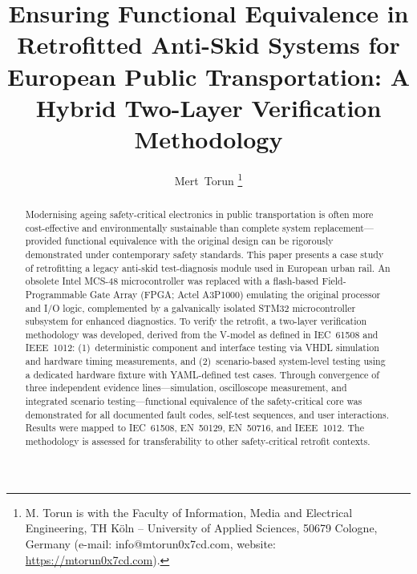 \documentclass[journal, a4paper]{IEEEtran}
\begin{document}
\thispagestyle{empty}

\title{Ensuring Functional Equivalence in Retrofitted Anti-Skid Systems for European Public Transportation: A Hybrid Two-Layer Verification Methodology}

\author{Mert~Torun \thanks{M. Torun is with the Faculty of Information, Media and Electrical Engineering, TH Köln -- University of Applied Sciences, 50679 Cologne, Germany (e-mail: info@mtorun0x7cd.com, website: \url{https://mtorun0x7cd.com}).}}

\markboth{}%
{}

\maketitle

\begin{abstract}
Modernising ageing safety-critical electronics in public transportation is often more cost-effective and environmentally sustainable than complete system replacement---provided functional equivalence with the original design can be rigorously demonstrated under contemporary safety standards. This paper presents a case study of retrofitting a legacy anti-skid test-diagnosis module used in European urban rail. An obsolete Intel MCS-48 microcontroller was replaced with a flash-based Field-Programmable Gate Array (FPGA; Actel A3P1000) emulating the original processor and I/O logic, complemented by a galvanically isolated STM32 microcontroller subsystem for enhanced diagnostics. To verify the retrofit, a two-layer verification methodology was developed, derived from the V-model as defined in IEC~61508 and IEEE~1012: (1)~deterministic component and interface testing via VHDL simulation and hardware timing measurements, and (2)~scenario-based system-level testing using a dedicated hardware fixture with YAML-defined test cases. Through convergence of three independent evidence lines---simulation, oscilloscope measurement, and integrated scenario testing---functional equivalence of the safety-critical core was demonstrated for all documented fault codes, self-test sequences, and user interactions. Results were mapped to IEC~61508, EN~50129, EN~50716, and IEEE~1012. The methodology is assessed for transferability to other safety-critical retrofit contexts.
\end{abstract}
\end{document}
